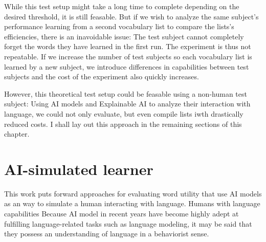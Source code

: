 While this test setup might take a long time to complete depending on the desired threshold, it is still feasable.
But if we wish to analyze the same subject's performance learning from a second vocabulary list to compare the lists's efficiencies, there is an inavoidable issue:
The test subject cannot completely forget the words they have learned in the first run.
The experiment is thus not repeatable.
If we increase the number of test subjects so each vocabulary list is learned by a new subject, we introduce differences in capabilities between test subjects and the cost of the experiment also quickly increases.

However, this theoretical test setup could be feasable using a non-human test subject:
Using AI models and Explainable AI to analyze their interaction with language, we could not only evaluate, but even compile lists iwth drastically reduced costs.
I shall lay out this approach in the remaining sections of this chapter.

\section{AI-simulated learner}


This work puts forward approaches for evaluating word utility that use AI models as an way to simulate a human interacting with language.
Humans with language capabilities
Because AI model in recent years have become highly adept at fulfilling language-related tasks such as language modeling, it may be said that they possess an understanding of language in a behaviorist sense.

